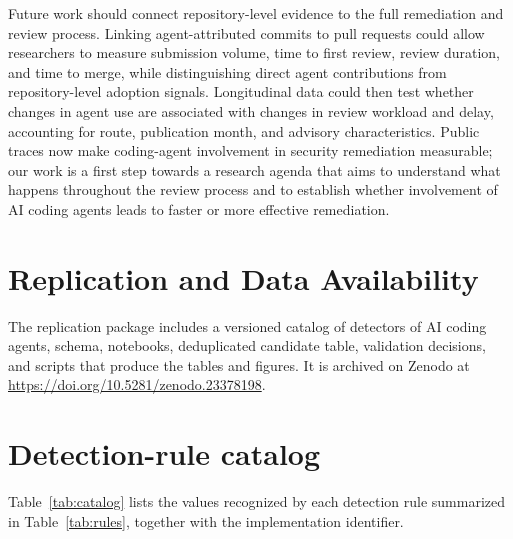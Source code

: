 \documentclass[smallextended,natbib]{svjour3}
\begin{document}
Future work should connect repository-level evidence to the full remediation
and review process. Linking agent-attributed commits to pull requests could
allow researchers to measure submission volume, time to first review, review
duration, and time to merge, while distinguishing direct agent contributions
from repository-level adoption signals. Longitudinal data could then test
whether changes in agent use are associated with changes in review workload
and delay, accounting for route, publication month, and advisory
characteristics. Public traces now make coding-agent involvement in security
remediation measurable; our work is a first step towards a research agenda that aims to understand  what happens throughout
the review process and  to establish  whether involvement of  AI coding agents   leads to faster
or more effective remediation.

 \section{Replication and Data Availability}
\label{sec:replication}

The replication package   includes a  versioned   catalog of detectors of AI coding agents, schema,
notebooks, deduplicated candidate table, validation decisions, and scripts that
produce the tables and figures. It is archived on Zenodo at \url{https://doi.org/10.5281/zenodo.23378198}.
 \appendix

\section{Detection-rule catalog}
\label{app:catalog}

Table~\ref{tab:catalog} lists the values recognized by each detection rule
summarized in Table~\ref{tab:rules}, together with the implementation
identifier.
\end{document}
